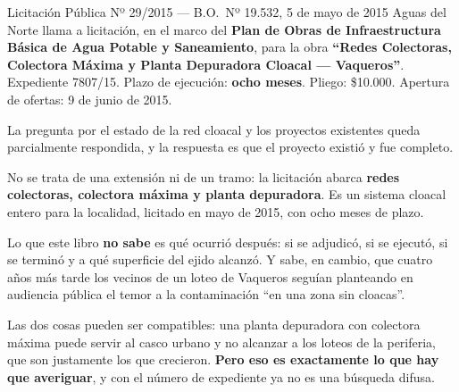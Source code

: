 \begin{ficha}{Licitación Pública Nº 29/2015 --- B.O.\ Nº 19.532, 5 de mayo de 2015}
Aguas del Norte llama a licitación, en el marco del \textbf{Plan de Obras de Infraestructura Básica de Agua Potable y Saneamiento}, para la obra \textbf{``Redes Colectoras, Colectora Máxima y Planta Depuradora Cloacal --- Vaqueros''}. Expediente 7807/15. Plazo de ejecución: \textbf{ocho meses}. Pliego: \$10.000. Apertura de ofertas: 9 de junio de 2015.
\end{ficha}

\begin{cautela}
La pregunta por el estado de la red cloacal y los proyectos existentes queda parcialmente respondida, y la respuesta es que el proyecto existió y fue completo.

No se trata de una extensión ni de un tramo: la licitación abarca \textbf{redes colectoras, colectora máxima y planta depuradora}. Es un sistema cloacal entero para la localidad, licitado en mayo de 2015, con ocho meses de plazo.

Lo que este libro \textbf{no sabe} es qué ocurrió después: si se adjudicó, si se ejecutó, si se terminó y a qué superficie del ejido alcanzó. Y sabe, en cambio, que cuatro años más tarde los vecinos de un loteo de Vaqueros seguían planteando en audiencia pública el temor a la contaminación ``en una zona sin cloacas''.

Las dos cosas pueden ser compatibles: una planta depuradora con colectora máxima puede servir al casco urbano y no alcanzar a los loteos de la periferia, que son justamente los que crecieron. \textbf{Pero eso es exactamente lo que hay que averiguar}, y con el número de expediente ya no es una búsqueda difusa.
\end{cautela}

